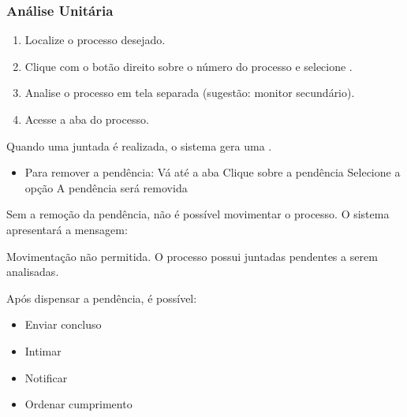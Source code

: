 \documentclass[letterpaper,10pt,brazil]{sphinxmanual}
\begin{document}
\subsubsection{Análise Unitária}
\label{\detokenize{projud_06_analisejuntada_multiplaeunitaria:analise-unitaria}}\begin{enumerate}
%
\item {} 
\sphinxAtStartPar
Localize o processo desejado.

\item {} 
\sphinxAtStartPar
Clique com o botão direito sobre o número do processo e selecione .

\item {} 
\sphinxAtStartPar
Analise o processo em tela separada (sugestão: monitor secundário).

\item {} 
\sphinxAtStartPar
Acesse a aba  do processo.

\end{enumerate}

\sphinxAtStartPar
{} Quando uma juntada é realizada, o sistema gera uma .
\begin{itemize}
\item {} 
\sphinxAtStartPar
Para remover a pendência:
\sphinxhyphen{} Vá até a aba 
\sphinxhyphen{} Clique sobre a pendência
\sphinxhyphen{} Selecione a opção 
\sphinxhyphen{} A pendência será removida

\end{itemize}

\sphinxAtStartPar
Sem a remoção da pendência, não é possível movimentar o processo. O sistema apresentará a mensagem:

\sphinxAtStartPar
Movimentação não permitida. O processo possui juntadas pendentes a serem analisadas.

\sphinxAtStartPar
Após dispensar a pendência, é possível:
\begin{itemize}
\item {} 
\sphinxAtStartPar
Enviar concluso

\item {} 
\sphinxAtStartPar
Intimar

\item {} 
\sphinxAtStartPar
Notificar

\item {} 
\sphinxAtStartPar
Ordenar cumprimento

\end{itemize}
\end{document}
